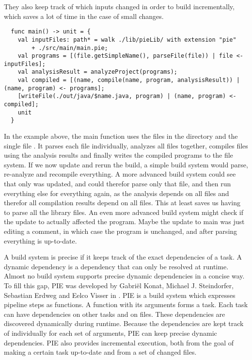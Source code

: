 They also keep track of which inputs changed in order to build incrementally, which saves a lot of time in the case of small changes.
\begin{lstlisting}
  func main() -> unit = {
    val inputFiles: path* = walk ./lib/pieLib/ with extension "pie"
        + ./src/main/main.pie;
    val programs = [(file.getSimpleName(), parseFile(file)) | file <- inputFiles];
    val analysisResult = analyzeProject(programs);
    val compiled = [(name, compile(name, program, analysisResult)) | (name, program) <- programs];
    [writeFile(./out/java/$name.java, program) | (name, program) <- compiled];
    unit
  }
\end{lstlisting}
In the example above, the main function uses the files in the directory  and the single file .
It parses each file individually, analyzes all files together, compiles files using the analysis results and finally writes the compiled programs to the file system.
If we now update  and rerun the build, a simple build system would parse, re-analyze and recompile everything.
A more advanced build system could see that only  was updated, and could therefor parse only that file, and then run everything else for everything again, as the analysis depends on all files and therefor all compilation results depend on all files.
This at least saves us having to parse all the library files.
An even more advanced build system might check if the update to  actually affected the program.
Maybe the update to main was just editing a comment, in which case the program is unchanged, and after parsing  everything is up-to-date.

A build system is precise if it keeps track of the exact dependencies of a task.
A dynamic dependency is a dependency that can only be resolved at runtime.
Almost no build system supports precise dynamic dependencies in a concise way.
To fill this gap, \ac{PIE} was developed by Gabriël Konat, Michael J. Steindorfer, Sebastian Erdweg and Eelco Visser in \autocite{KonatSEV18}.
\Ac{PIE} is a build system which expresses pipeline steps as functions.
A function with its arguments forms a task.
Each task can have dependencies on other tasks and on files.
These dependencies are discovered dynamically during runtime.
Because the dependencies are kept track of individually for each set of arguments, \ac{PIE} can keep precise dynamic dependencies.
\Ac{PIE} also provides incremental execution, both from the goal of making a certain task up-to-date and from a set of changed files.

